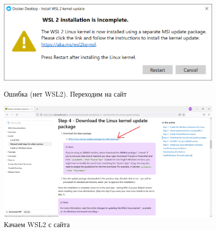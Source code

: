 \begin{figure}[!p]
    \centering
    \begin{minipage}{0.47\textwidth}
        \centering
        \includegraphics[width=\linewidth]
            {_assets/gpi_pz_docker_07.png}
        \caption{Ошибка (нет WSL2). Переходим на сайт}
        \label{fig:gpi_pz_docker_07}
    \end{minipage}
    \begin{minipage}{0.47\textwidth}
        \centering
        \includegraphics[width=\linewidth]
            {_assets/gpi_pz_docker_08.png}
        \caption{Качаем WSL2 с сайта}
        \label{fig:gpi_pz_docker_08}
    \end{minipage}
\end{figure}

